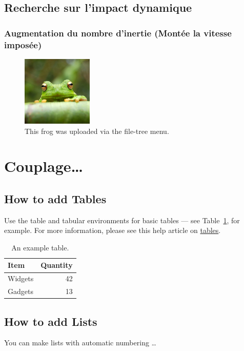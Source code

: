 \documentclass[a4paper,12pt]{report}
\begin{document}
\subsection{Recherche sur l'impact dynamique}

\subsubsection{Augmentation du nombre d'inertie (Montée la vitesse imposée)}
\begin{figure}
\centering
\includegraphics[width=0.3\textwidth]{frog.jpg}
\caption{\label{fig:frog}This frog was uploaded via the file-tree menu.}
\end{figure}

\section{Couplage\ldots}
\subsection{How to add Tables}

Use the table and tabular environments for basic tables --- see Table~\ref{tab:widgets}, for example. For more information, please see this help article on \href{https://www.overleaf.com/learn/latex/tables}{tables}. 

\begin{table}
\centering
\begin{tabular}{l|r}
Item & Quantity \\\hline
Widgets & 42 \\
Gadgets & 13
\end{tabular}
\caption{\label{tab:widgets}An example table.}
\end{table}

\subsection{How to add Lists}

You can make lists with automatic numbering \dots
\end{document}

